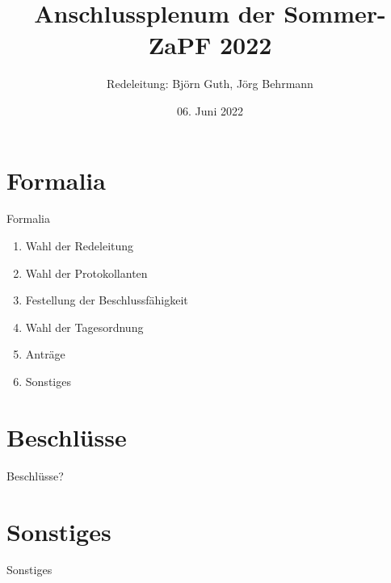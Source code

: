 \documentclass[compress,aspectratio=169]{beamer}
\title[Anschlussplenum SoSe22]{Anschlussplenum der Sommer-ZaPF 2022}
\author{Redeleitung: Björn Guth, Jörg Behrmann}
\institute[Zusammenkunft aller Physikfachschaften]
\date{06. Juni 2022}
\begin{document}
\begin{frame}[plain]{}
  \titlepage
\end{frame}

\section{Formalia}
\begin{frame}{Formalia}
    \begin{enumerate}
        \item Wahl der Redeleitung
        \item Wahl der Protokollanten
        \item Festellung der Beschlussfähigkeit
        \item Wahl der Tagesordnung
        \item Anträge
        \item Sonstiges
    \end{enumerate}
\end{frame}

\section{Beschlüsse}
\begin{frame}{}
    Beschlüsse?
\end{frame}

\section{Sonstiges}
\begin{frame}{Sonstiges}
\end{frame}
\end{document}
